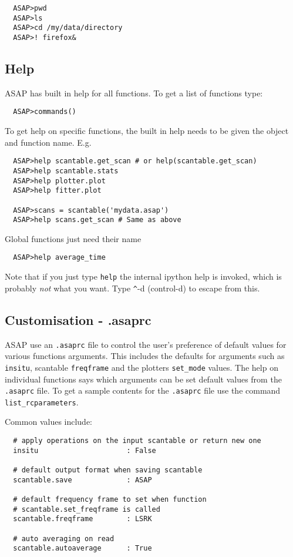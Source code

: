 \documentclass[11pt]{article}
\newcommand{\cmd}[1]{{\tt #1}}
\begin{document}
\begin{verbatim}
  ASAP>pwd
  ASAP>ls
  ASAP>cd /my/data/directory
  ASAP>! firefox&
\end{verbatim}

\subsection{Help}

ASAP has built in help for all functions. To get a list of
functions type:

\begin{verbatim}
  ASAP>commands()
\end{verbatim}

To get help on specific functions, the built in help needs to be given
the object and function name. E.g.

\begin{verbatim}
  ASAP>help scantable.get_scan # or help(scantable.get_scan)
  ASAP>help scantable.stats
  ASAP>help plotter.plot
  ASAP>help fitter.plot

  ASAP>scans = scantable('mydata.asap')
  ASAP>help scans.get_scan # Same as above
\end{verbatim}

Global functions just need their name

\begin{verbatim}
  ASAP>help average_time
\end{verbatim}

Note that if you just type \cmd{help} the internal ipython help is
invoked, which is probably {\em not} what you want. Type \verb+^+-d
(control-d) to escape from this.

\subsection{Customisation - .asaprc}

ASAP use an \cmd{.asaprc} file to control the user's
preference of default values for various functions arguments. This
includes the defaults for arguments such as \cmd{insitu}, scantable
\cmd{freqframe} and the plotters \cmd{set\_mode} values. The help on
individual functions says which arguments can be set default values
from the \cmd{.asaprc} file. To get a sample contents for the
\cmd{.asaprc} file use the command \cmd{list\_rcparameters}.

Common values include:
\begin{verbatim}
  # apply operations on the input scantable or return new one
  insitu                     : False

  # default output format when saving scantable
  scantable.save             : ASAP

  # default frequency frame to set when function
  # scantable.set_freqframe is called
  scantable.freqframe        : LSRK

  # auto averaging on read
  scantable.autoaverage      : True
\end{verbatim}
\end{document}
